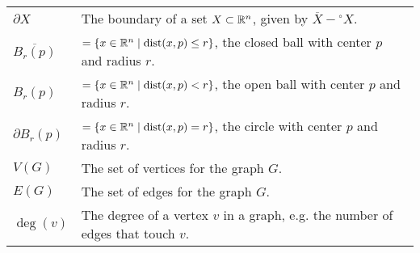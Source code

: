 \begin{table}[H]
\begin{tabular}{ll}
$\partial X$  & The boundary of a set $X \subset \mathbb{R}^n$, given by $\overline{X} - {}^{\circ}X$. \\
$\overline{B_r(p)}$ & $ = \{x \in \mathbb{R}^n \mid \operatorname{dist}(x, p) \leq r\}$, the closed ball with center $p$ and radius $r$. \\
$B_r(p)$ & $ = \{x \in \mathbb{R}^n \mid \operatorname{dist}(x, p) < r\}$, the open ball with center $p$ and radius $r$. \\
$\partial{B_r(p)}$ & $ = \{x \in \mathbb{R}^n \mid \operatorname{dist}(x, p) = r\}$, the circle with center $p$ and radius $r$. \\
$V(G)$ & The set of vertices for the graph $G$. \\
$E(G)$ & The set of edges for the graph $G$. \\
$\deg(v)$ & The degree of a vertex $v$ in a graph, e.g. the number of edges that touch $v$.
\end{tabular}
\end{table}